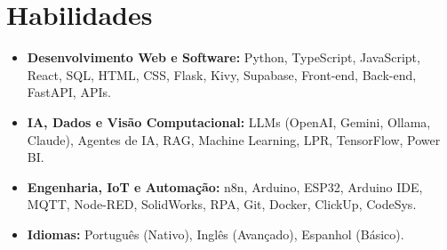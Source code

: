 \documentclass[a4paper,10pt]{article}
\begin{document}

\section{Habilidades}
    \begin{itemize}
        \item \textbf{Desenvolvimento Web e Software:} Python, TypeScript, JavaScript, React, SQL, HTML, CSS, Flask, Kivy, Supabase, Front-end, Back-end, FastAPI, APIs.
        \item \textbf{IA, Dados e Visão Computacional:} LLMs (OpenAI, Gemini, Ollama, Claude), Agentes de IA, RAG, Machine Learning, LPR, TensorFlow, Power BI.
        \item \textbf{Engenharia, IoT e Automação:} n8n, Arduino, ESP32, Arduino IDE, MQTT, Node-RED, SolidWorks, RPA, Git, Docker, ClickUp, CodeSys.
        \item \textbf{Idiomas:} Português (Nativo), Inglês (Avançado), Espanhol (Básico).
    \end{itemize}
\end{document}
